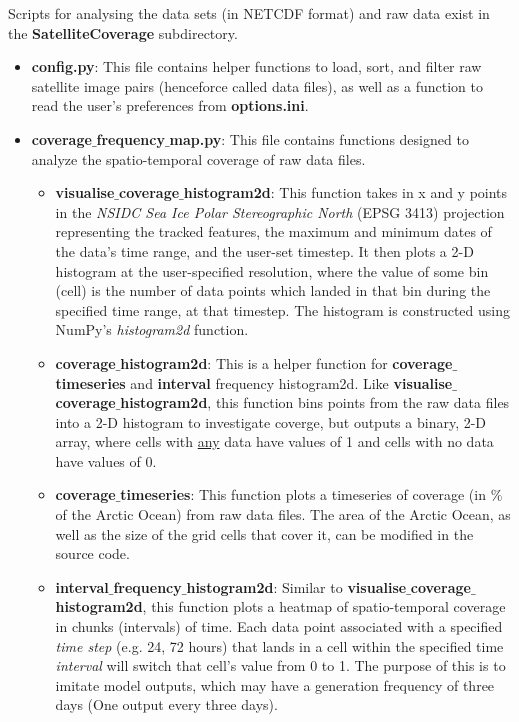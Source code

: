 \documentclass{article}
\begin{document}
        Scripts for analysing the data sets (in NETCDF format) and raw data exist in the \textbf{SatelliteCoverage} subdirectory.
        \begin{itemize}
            \item \textbf{config.py}: This file contains helper functions to load, sort, and filter raw satellite image pairs (henceforce called data files), as well as a function to read the user's preferences from \textbf{options.ini}.
            \item \textbf{coverage$\_$frequency$\_$map.py}: This file contains functions designed to analyze the spatio-temporal coverage of raw data files.
            \begin{itemize}
                \item \textbf{visualise$\_$coverage$\_$histogram2d}: This function takes in x and y points in the \textit{NSIDC Sea Ice Polar Stereographic North} (EPSG 3413) projection representing the tracked features, the maximum and minimum dates of the data's time range, and the user-set timestep. It then plots a 2-D histogram at the user-specified resolution, where the value of some bin (cell) is the number of data points which landed in that bin during the specified time range, at that timestep. The histogram is constructed using NumPy's \textit{histogram2d} function.
                \item \textbf{coverage$\_$histogram2d}: This is a helper function for \textbf{coverage$\_$timeseries} and \textbf{interval} frequency histogram2d. Like \textbf{visualise$\_$coverage$\_$histogram2d}, this function bins points from the raw data files into a 2-D histogram to investigate coverge, but outputs a binary, 2-D array, where cells with \underline{any} data have values of 1 and cells with no data have values of 0.
                \item \textbf{coverage$\_$timeseries}: This function plots a timeseries of coverage (in $\%$ of the Arctic Ocean) from raw data files. The area of the Arctic Ocean, as well as the size of the grid cells that cover it, can be modified in the source code.
                \item \textbf{interval$\_$frequency$\_$histogram2d}: Similar to \textbf{visualise$\_$coverage$\_$histogram2d}, this function plots a heatmap of spatio-temporal coverage in chunks (intervals) of time. Each data point associated with a specified \textit{time step} (e.g. 24, 72 hours) that lands in a cell within the specified time \textit{interval} will switch that cell's value from 0 to 1. The purpose of this is to imitate model outputs, which may have a generation frequency of three days (One output every three days).

\end{itemize}
\end{itemize}
\end{document}
